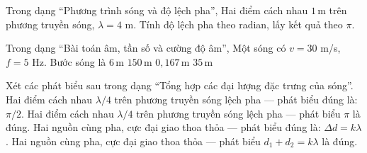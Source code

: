 \begin{ex}
Trong dạng “Phương trình sóng và độ lệch pha”, Hai điểm cách nhau $1\,\text{m}$ trên phương truyền sóng, $\lambda=4$ m. Tính độ lệch pha theo radian, lấy kết quả theo $\pi$.
\end{ex}

\begin{ex}
Trong dạng “Bài toán âm, tần số và cường độ âm”, Một sóng có $v=30$ m/s, $f=5$ Hz. Bước sóng là
\choice
{\True $6\,\text{m}$}
{$150\,\text{m}$}
{$0,167\,\text{m}$}
{$35\,\text{m}$}
\end{ex}

\begin{ex}
Xét các phát biểu sau trong dạng “Tổng hợp các đại lượng đặc trưng của sóng”.
\choiceTF
{\True Hai điểm cách nhau $\lambda/4$ trên phương truyền sóng lệch pha — phát biểu đúng là: $\pi/2$.}
{Hai điểm cách nhau $\lambda/4$ trên phương truyền sóng lệch pha — phát biểu $\pi$ là đúng.}
{\True Hai nguồn cùng pha, cực đại giao thoa thỏa — phát biểu đúng là: $\Delta d=k\lambda$.}
{Hai nguồn cùng pha, cực đại giao thoa thỏa — phát biểu $d_1+d_2=k\lambda$ là đúng.}
\end{ex}

